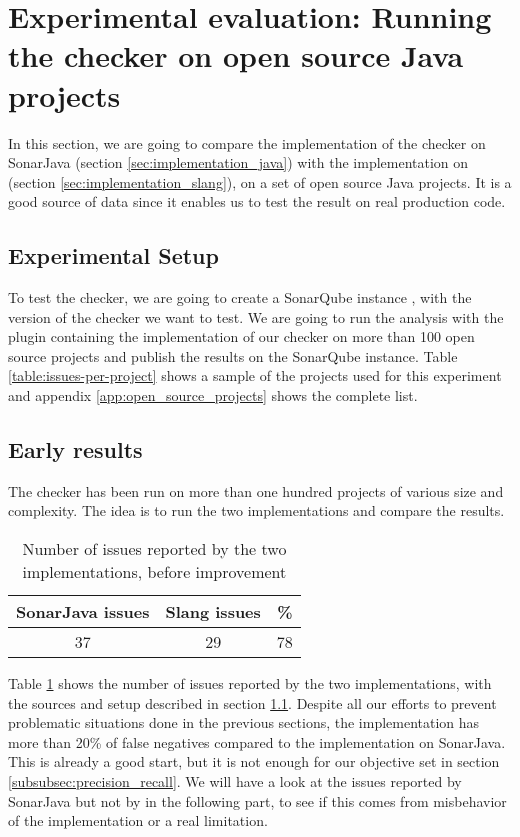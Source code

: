 \section{Experimental evaluation: \newline Running the checker on open source Java projects}
\label{sec:running_checker}

In this section, we are going to compare the implementation of the checker on SonarJava (section \ref{sec:implementation_java}) with the implementation on \slang{} (section \ref{sec:implementation_slang}), on a set of open source Java projects. 
It is a good source of data since it enables us to test the result on real production code.

\subsection{Experimental Setup}
\label{subsec:experimental_setup}

To test the checker, we are going to create a SonarQube instance \cite{SonarQube:2019:Online}, with the version of the checker we want to test. We are going to run the analysis with the plugin containing the implementation of our checker on more than 100 open source projects and publish the results on the SonarQube instance. Table \ref{table:issues-per-project} shows a sample of the projects used for this experiment and appendix \ref{app:open_source_projects} shows the complete list.

\subsection{Early results}
\label{subsec:early_results}

The checker has been run on more than one hundred projects of various size and complexity. 
The idea is to run the two implementations and compare the results.

\begin{table}[h]
	\centering
	\caption{Number of issues reported by the two implementations, before improvement}
	\label{table:early-sonarjava-vs-slang}
	\begin{tabular}{|c|c|c|}
		\hline
		\bf SonarJava issues & \bf Slang issues & \bf \% \\ \hline
		37 &  29 &  78 \\ \hline
	\end{tabular}
\end{table}


Table \ref{table:early-sonarjava-vs-slang} shows the number of issues reported by the two implementations, with the sources and setup described in section \ref{subsec:experimental_setup}. 
Despite all our efforts to prevent problematic situations done in the previous sections, the implementation has more than 20\% of false negatives compared to the implementation on SonarJava. 
This is already a good start, but it is not enough for our objective set in section \ref{subsubsec:precision_recall}.
We will have a look at the issues reported by SonarJava but not by \slang{} in the following part, to see if this comes from misbehavior of the implementation or a real limitation.

